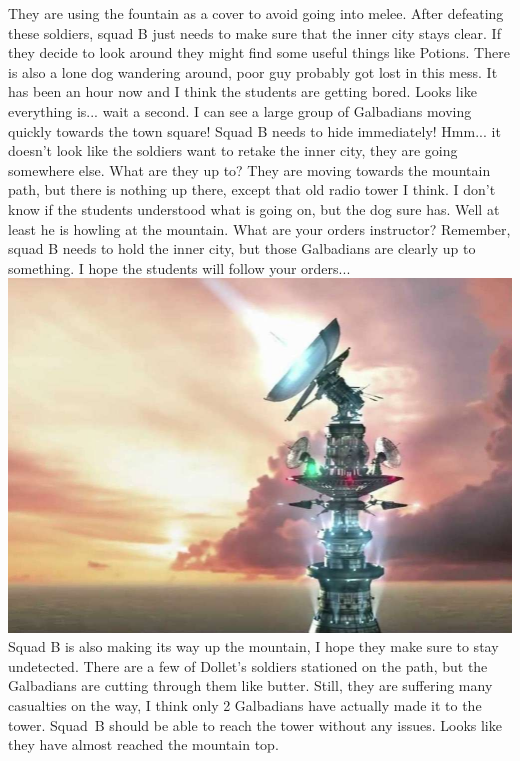 They are using the fountain as a cover to avoid going into melee.  
After defeating these soldiers, squad B just needs to make sure that the inner city stays clear. 
If they decide to look around they might find some useful things like Potions.
There is also a lone dog wandering around, poor guy probably got lost in this mess.
It has been an hour now and I think the students are getting bored. 
Looks like everything is... wait a second.
I can see a large group of Galbadians moving quickly towards the town square!
Squad B needs to hide immediately! 
Hmm... it doesn't look like the soldiers want to retake the inner city, they are going somewhere else.
What are they up to?
%
\vfill
%
They are moving towards the mountain path, but there is nothing up there, except that old radio tower I think.
I don't know if the students understood what is going on, but the dog sure has.
Well at least he is howling at the mountain.
What are your orders instructor?
Remember, squad B needs to hold the inner city, but those Galbadians are clearly up to something.
I hope the students will follow your orders...
%
\clearpage
%
%
\vfill
%
\includegraphics[width=\columnwidth]{./art/siegeofdollet/tower.jpg}
%
\vfill
%
Squad B is also making its way up the mountain, I hope they make sure to stay undetected.
There are a few of Dollet's soldiers stationed on the path, but the Galbadians are cutting through them like butter.
Still, they are suffering many casualties on the way, I think only 2 Galbadians have actually made it to the tower.
Squad~B should be able to reach the tower without any issues.
Looks like they have almost reached the mountain top.
